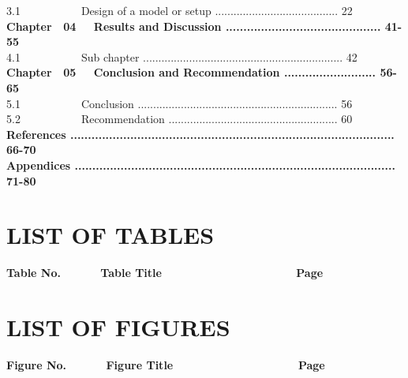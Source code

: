 \documentclass[11pt,a4paper,oneside]{memoir}
\begin{document}
{\Large     3.1 \,\,\,\,\,\,\,\,\,\,\,\,\,\,\,\,\,\,\,\,\,\,\,\,\,\,\,\,\,\,\,Design of a model or setup ........................................ 22}\\

{\Large
\textbf{Chapter \,\,\,\,04 \,\,\,\,\, Results and Discussion ............................................ 41-55}
}\\

{\Large     4.1 \,\,\,\,\,\,\,\,\,\,\,\,\,\,\,\,\,\,\,\,\,\,\,\,\,\,\,\,\,\,\,Sub chapter ................................................................. 42}\\

{\Large
\textbf{Chapter \,\,\,\,05 \,\,\,\,\, Conclusion and Recommendation .......................... 56-65}
}\\

{\Large     5.1 \,\,\,\,\,\,\,\,\,\,\,\,\,\,\,\,\,\,\,\,\,\,\,\,\,\,\,\,\,\,\,Conclusion ................................................................. 56}\\

{\Large     5.2 \,\,\,\,\,\,\,\,\,\,\,\,\,\,\,\,\,\,\,\,\,\,\,\,\,\,\,\,\,\,\,Recommendation ....................................................... 60}\\

{\Large
\textbf{References ............................................................................................ 66-70}
}\\

{\Large
\textbf{Appendices ........................................................................................... 71-80}
}\\

\chapter*{LIST OF TABLES}

{\Large
\textbf{Table No. \,\,\,\,\,\,\,\,\,\,\,\,\,\,\,\,\, Table Title\,\,\,\,\,\,\,\,\,\,\,\,\,\,\,\,\,\,\,\,\,\,\,\,\,\,\,\,\,\,\,\,\,\,\,\,\,\,\,\,\,\,\,\,\,\,\,\,\,\,\,\,\,\,\,\,\,\,\,\,\,\,\,\,\,\,\,\,\,\,\,\,\,Page}
}\\

\chapter*{LIST OF FIGURES}
{\Large
\textbf{Figure No. \,\,\,\,\,\,\,\,\,\,\,\,\,\,\,\,\, Figure Title\,\,\,\,\,\,\,\,\,\,\,\,\,\,\,\,\,\,\,\,\,\,\,\,\,\,\,\,\,\,\,\,\,\,\,\,\,\,\,\,\,\,\,\,\,\,\,\,\,\,\,\,\,\,\,\,\,\,\,\,\,\,\,\,\,\,\,\,Page}
}\\
\end{document}
